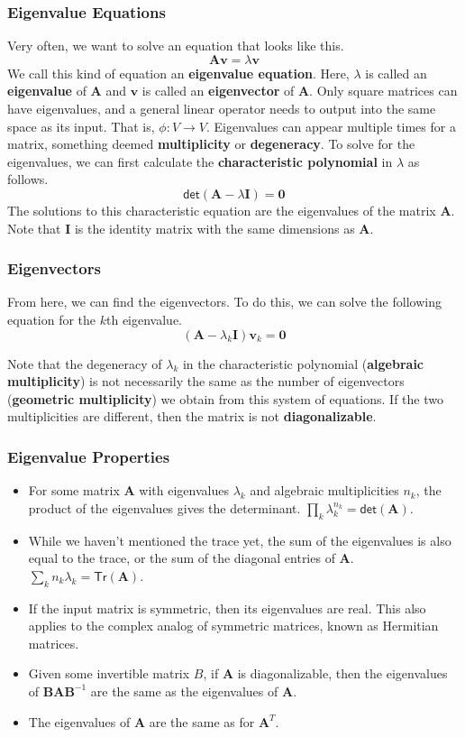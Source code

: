 \documentclass[10pt]{beamer}
\begin{document}
\begin{frame}
  \frametitle{Eigenvalue Equations}
  Very often, we want to solve an equation that looks like this.
  $$\mathbf{Av} = \lambda\mathbf{v}$$
  We call this kind of equation an \textbf{eigenvalue equation}. Here, $\lambda$ is called an \textbf{eigenvalue} of $\mathbf{A}$ and $\mathbf{v}$ is called an \textbf{eigenvector} of $\mathbf{A}$. Only square matrices can have eigenvalues, and a general linear operator needs to output into the same space as its input. That is, $\phi: V \rightarrow V$. Eigenvalues can appear multiple times for a matrix, something deemed \textbf{multiplicity} or \textbf{degeneracy}. To solve for the eigenvalues, we can first calculate the \textbf{characteristic polynomial} in $\lambda$ as follows.
  $$\mathsf{det}\left(\mathbf{A} - \lambda\mathbf{I}\right) = \mathbf{0}$$
  The solutions to this characteristic equation are the eigenvalues of the matrix $\mathbf{A}$. Note that $\mathbf{I}$ is the identity matrix with the same dimensions as $\mathbf{A}$.
\end{frame}

\begin{frame}
  \frametitle{Eigenvectors}
  From here, we can find the eigenvectors. To do this, we can solve the following equation for the $k$th eigenvalue.
  $$\left(\mathbf{A} - \lambda_k\mathbf{I}\right)\mathbf{v}_k = \mathbf{0}$$

  Note that the degeneracy of $\lambda_k$ in the characteristic polynomial (\textbf{algebraic multiplicity}) is not necessarily the same as the number of eigenvectors (\textbf{geometric multiplicity}) we obtain from this system of equations. If the two multiplicities are different, then the matrix is not \textbf{diagonalizable}.
\end{frame}

\begin{frame}
  \frametitle{Eigenvalue Properties}
  \begin{itemize}
  \item For some matrix $\mathbf{A}$ with eigenvalues $\lambda_k$ and algebraic multiplicities $n_k$, the product of the eigenvalues gives the determinant. $\prod_k\lambda_k^{n_k} = \mathsf{det}\left(\mathbf{A}\right)$.
  \item While we haven't mentioned the trace yet, the sum of the eigenvalues is also equal to the trace, or the sum of the diagonal entries of $\mathbf{A}$. $\sum_k n_k\lambda_{k} = \mathsf{Tr}\left(\mathbf{A}\right)$.
  \item If the input matrix is symmetric, then its eigenvalues are real. This also applies to the complex analog of symmetric matrices, known as Hermitian matrices.
  \item Given some invertible matrix $B$, if $\mathbf{A}$ is diagonalizable, then the eigenvalues of $\mathbf{BAB}^{-1}$ are the same as the eigenvalues of $\mathbf{A}$.
    \item The eigenvalues of $\mathbf{A}$ are the same as for $\mathbf{A}^T$.
  \end{itemize}
\end{frame}
\end{document}
